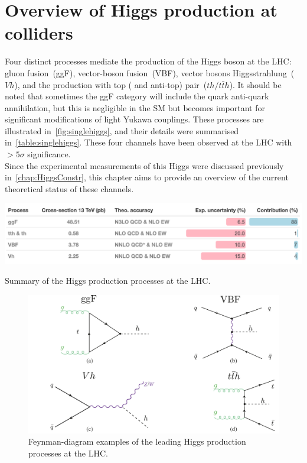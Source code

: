 
\chapter{ Overview of Higgs production at colliders }\label{chap:overviewSingleHiggs}
Four distinct processes mediate the production of the Higgs boson at the LHC: gluon fusion~(ggF), vector-boson fusion~(VBF), vector bosons Higgsstrahlung~($Vh$), and the production with top ( and anti-top) pair~($th / t \bar th$). It should be noted that sometimes the ggF category will include the quark anti-quark annihilation, but this is negligible in the SM but becomes important for significant modifications of light Yukawa couplings. These processes are illustrated in~\autoref{fig:singlehiggs}, and their details were summarised in~\autoref{table:singlehiggs}. These four channels have been observed at the LHC with $>5 \sigma$ significance. \\ 
Since the experimental measurements of this Higgs were discussed previously in~\autoref{chap:HiggsConstr}, this chapter aims to provide an overview of the current theoretical status of these channels.
\begin{table}[htbp!]
	\includegraphics[width=1\textwidth]{single_higgs_table}
	\caption{ Summary of the Higgs production processes at the LHC. \label{table:singlehiggs} }
\end{table}
\begin{figure}[htbp!]
	\begin{center}
		\includegraphics[width=.75\textwidth]{figures/single_higgs}
		\caption{Feynman-diagram examples of the leading Higgs production processes  at the LHC. \label{fig:singlehiggs} }
	\end{center}
\end{figure}
